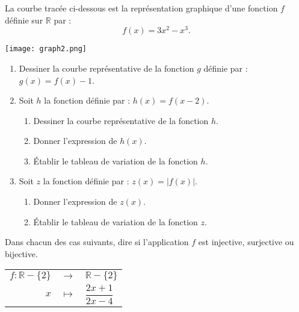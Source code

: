 \documentclass{article}
\begin{document}

\bigskip

La courbe tracée ci-dessous est la représentation graphique d’une fonction \( f \) définie sur \( \mathbb{R} \) par :  
\[
f(x) = 3x^2 - x^3.
\]

\bigskip

\begin{center}
    \texttt{[image: graph2.png]} %
\end{center}

\bigskip

\begin{enumerate}
    \item Dessiner la courbe représentative de la fonction \( g \) définie par : \( g(x) = f(x) - 1 \).
    
    \item Soit \( h \) la fonction définie par : \( h(x) = f(x-2) \).
    \begin{enumerate}
        \item Dessiner la courbe représentative de la fonction \( h \).
        \item Donner l’expression de \( h(x) \).
        \item Établir le tableau de variation de la fonction \( h \).
    \end{enumerate}
    
    \item Soit \( z \) la fonction définie par : \( z(x) = |f(x)| \).
    \begin{enumerate}
        \item Donner l’expression de \( z(x) \).
        \item Établir le tableau de variation de la fonction \( z \).
    \end{enumerate}
\end{enumerate}


\bigskip

Dans chacun des cas suivants, dire si l’application \( f \) est injective, surjective ou bijective.

\bigskip

\renewcommand{\arraystretch}{1.3} %
\begin{tabular}{rcl}
    \( f : \mathbb{R} - \{2\} \) & \( \to \) & \( \mathbb{R} - \{2\} \) \\
    \( x \) & \( \mapsto \) & \( \dfrac{2x+1}{2x-4} \)
\end{tabular}
\end{document}
